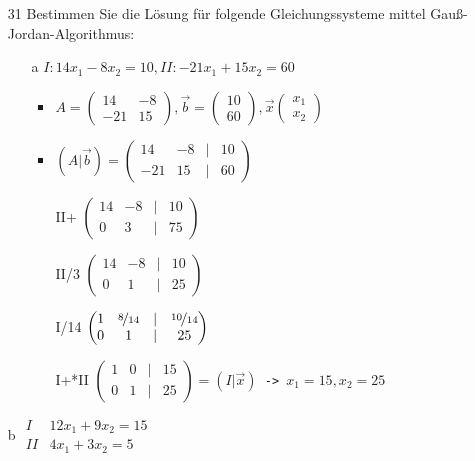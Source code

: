 \documentclass{article}
\begin{document}
\begin{itemize}
\begin{itemize}
\begin{itemize}
			\end{itemize}
			\item[31]{Bestimmen Sie die Lösung für folgende Gleichungssysteme mittel Gauß-Jordan-Algorithmus:}
			\begin{itemize}
				\item[a]{$I: 14x_1-8x_2=10, II: -21x_1+15x_2=60$}
				\begin{itemize}
					\item{$A=\begin{pmatrix} 14 & -8 \\ -21 & 15 \end{pmatrix}, \vec{b}=\begin{pmatrix} 10 \\ 60 \end{pmatrix}, \vec{x}\begin{pmatrix} x_1 \\ x_2 \end{pmatrix}$}
					\item{$(A|\vec{b})=\begin{pmatrix} 14 & -8 & | & 10 \\ -21 & 15 & | & 60 \end{pmatrix}$}
					\item[II+\nicefrac{3}{2}]{$\begin{pmatrix} 14 & -8 & | & 10 \\ 0 & 3 & | & 75 \end{pmatrix}$}
					\item[II/3]{$\begin{pmatrix} 14 & -8 & | & 10 \\ 0 & 1 & | & 25 \end{pmatrix}$}
					\item[I/14]{$\begin{pmatrix} 1 & \nicefrac{8}{14} & | & \nicefrac{10}{14} \\ 0 & 1 & | & 25 \end{pmatrix}$}
					\item[I+\nicefrac{8}{14}*II]{$\begin{pmatrix} 1 & 0 & | & 15 \\ 0 & 1 & | & 25 \end{pmatrix}=(I|\vec{x})$\texttt{ -> }$x_1=15, x_2=25$}
				\end{itemize}
			\end{itemize}
			\item[b]{$\begin{matrix} I & 12x_1+9x_2=15 \\ II & 4x_1+3x_2=5 \end{matrix}$}

\end{itemize}
\end{itemize}
\end{document}
